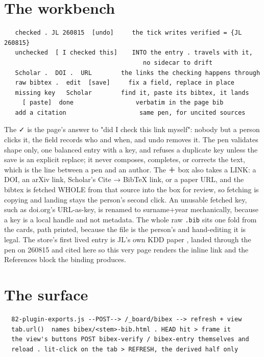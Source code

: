 \section{The workbench}
\begin{verbatim}
   checked . JL 260815  [undo]     the tick writes verified = {JL 260815}
   unchecked  [ I checked this]    INTO the entry . travels with it,
                                      no sidecar to drift
   Scholar .  DOI .  URL        the links the checking happens through
   raw bibtex .  edit  [save]     fix a field, replace in place
   missing key   Scholar        find it, paste its bibtex, it lands
     [ paste]  done                 verbatim in the page bib
   add a citation                    same pen, for uncited sources
\end{verbatim}
The ✓ is the page's answer to "did I check this link myself": nobody but a person clicks it, the field records who and when, and undo removes it. The pen validates shape only, one balanced entry with a key, and refuses a duplicate key unless the save is an explicit replace; it never composes, completes, or corrects the text, which is the line between a pen and an author. The ＋ box also takes a LINK: a DOI, an arXiv link, Scholar's Cite → BibTeX link, or a paper URL, and the bibtex is fetched WHOLE from that source into the box for review, so fetching is copying and landing stays the person's second click. An unusable fetched key, such as doi.org's URL-as-key, is renamed to surname+year mechanically, because a key is a local handle and not metadata. The whole raw \texttt{.bib} sits one fold from the cards, path printed, because the file is the person's and hand-editing it is legal. The store's first lived entry is JL's own KDD paper \citep{luo2026eventglucose}, landed through the pen on 260815 and cited here so this very page renders the inline link and the References block the binding produces.

\section{The surface}
\begin{verbatim}
  82-plugin-exports.js --POST--> /_board/bibex --> refresh + view
  tab.url()  names bibex/<stem>-bib.html . HEAD hit > frame it
  the view's buttons POST bibex-verify / bibex-entry themselves and
  reload . lit-click on the tab > REFRESH, the derived half only
\end{verbatim}
